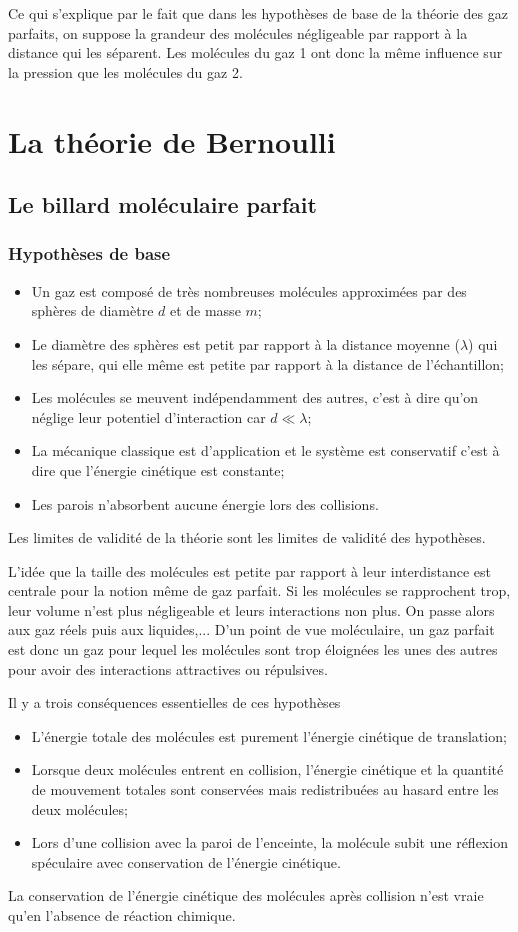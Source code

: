 Ce qui s'explique par le fait que dans les hypothèses de base
de la théorie des gaz parfaits, on suppose la grandeur des molécules
négligeable par rapport à la distance qui les séparent.
Les molécules du gaz 1 ont donc la même influence sur la pression que
les molécules du gaz 2.

\section{La théorie de Bernoulli}
\subsection{Le billard moléculaire parfait}
\subsubsection{Hypothèses de base}
\begin{itemize}
  \item Un gaz est composé de très nombreuses molécules approximées
    par des sphères de diamètre $d$ et de masse $m$;
  \item Le diamètre des sphères est petit par rapport
    à la distance moyenne ($\lambda$) qui les sépare, qui elle même est petite
    par rapport à la distance de l'échantillon;
  \item Les molécules se meuvent indépendamment des autres,
    c'est à dire qu'on néglige leur potentiel d'interaction car $d \ll \lambda$;
  \item La mécanique classique est d'application et le système est conservatif
    c'est à dire que l'énergie cinétique est constante;
  \item Les parois n'absorbent aucune énergie lors des collisions.
\end{itemize}
Les limites de validité de la théorie sont
les limites de validité des hypothèses.

L'idée que la taille des molécules est petite par rapport à leur interdistance
est centrale pour la notion même de gaz parfait.
Si les molécules se rapprochent trop,
leur volume n'est plus négligeable et leurs interactions non plus.
On passe alors aux gaz réels puis aux liquides,...
D'un point de vue moléculaire,
un gaz parfait est donc un gaz pour lequel les molécules sont
trop éloignées les unes des autres pour avoir des interactions attractives ou
répulsives.

Il y a trois conséquences essentielles de ces hypothèses
\begin{itemize}
  \item L'énergie totale des molécules est purement
    l'énergie cinétique de translation;
  \item Lorsque deux molécules entrent en collision,
    l'énergie cinétique et la quantité de mouvement totales sont
    conservées mais redistribuées au hasard entre les deux molécules;
  \item Lors d'une collision avec la paroi de l'enceinte,
    la molécule subit une réflexion spéculaire avec conservation
    de l'énergie cinétique.
\end{itemize}
La conservation de l'énergie cinétique des molécules après collision
n'est vraie qu'en l'absence de réaction chimique.

